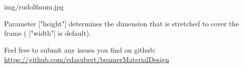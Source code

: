 \documentclass[aspectratio=43]{beamer}
\begin{document}
\begin{frameImg}[height]{img/rudolfinum.jpg}
\vspace*{60mm}
\begin{cardTiny}
Parameter {\color{primary} ["height"]} determines the dimension that is stretched to cover the frame ({\color{primary} ["width"]} is default).
\end{cardTiny}
\end{frameImg}

\begin{frame}
\begin{card}
Feel free to submit any issues you find on github: \\
{\footnotesize \url{https://github.com/edasubert/beamerMaterialDesign}}
\end{card}
\end{frame}
\end{document}
